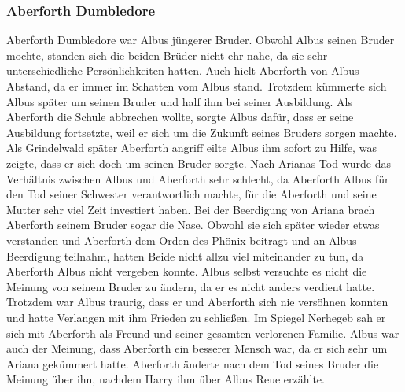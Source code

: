 \documentclass[a4paper, 10pt]{article}
\begin{document}
\subsubsection*{Aberforth Dumbledore}
Aberforth Dumbledore war Albus jüngerer Bruder. Obwohl Albus seinen Bruder mochte, standen sich die beiden Brüder nicht ehr nahe, da sie sehr unterschiedliche Persönlichkeiten hatten. Auch hielt Aberforth von Albus Abstand, da er immer im Schatten vom Albus stand. Trotzdem kümmerte sich Albus später um seinen Bruder und half ihm bei seiner Ausbildung. Als Aberforth die Schule abbrechen wollte, sorgte Albus dafür, dass er seine Ausbildung fortsetzte, weil er sich um die Zukunft seines Bruders sorgen machte. Als Grindelwald später Aberforth angriff eilte Albus ihm sofort zu Hilfe, was zeigte, dass er sich doch um seinen Bruder sorgte. Nach Arianas Tod wurde das Verhältnis zwischen Albus und Aberforth sehr schlecht, da Aberforth Albus für den Tod seiner Schwester verantwortlich machte, für die Aberforth und seine Mutter sehr viel Zeit investiert haben. Bei der Beerdigung von Ariana brach Aberforth seinem Bruder sogar die Nase. Obwohl sie sich später wieder etwas verstanden und Aberforth dem Orden des Phönix beitragt und an Albus Beerdigung teilnahm, hatten Beide nicht allzu viel miteinander zu tun, da Aberforth Albus nicht vergeben konnte. Albus selbst versuchte es nicht die Meinung von seinem Bruder zu ändern, da er es nicht anders verdient hatte. Trotzdem war Albus traurig, dass er und Aberforth sich nie versöhnen konnten und hatte Verlangen mit ihm Frieden zu schließen. Im Spiegel Nerhegeb sah er sich mit Aberforth als Freund und seiner gesamten verlorenen Familie. Albus war auch der Meinung, dass Aberforth ein besserer Mensch war, da er sich sehr um Ariana gekümmert hatte. Aberforth änderte nach dem Tod seines Bruder die Meinung über ihn, nachdem Harry ihm über Albus Reue erzählte.
\end{document}
